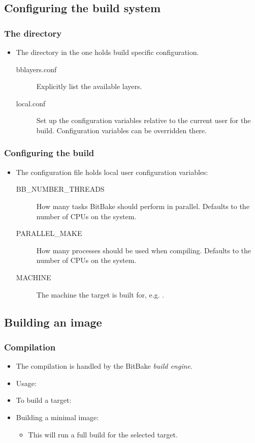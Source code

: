 \subsection{Configuring the build system}

\begin{frame}
  \frametitle{The  directory}
  \begin{itemize}
    \item The  directory in the  one holds 
      build specific configuration.
    \begin{description}
      \item[bblayers.conf] Explicitly list the available layers.
      \item[local.conf] Set up the configuration variables relative to
        the current user for the build. Configuration variables can be
        overridden there.
    \end{description}
  \end{itemize}
\end{frame}

\begin{frame}
  \frametitle{Configuring the build}
  \begin{itemize}
    \item The  configuration file holds local
    user configuration variables:
    \begin{description}
      \item[BB\_NUMBER\_THREADS] How many tasks BitBake should perform
        in parallel. Defaults to the number of CPUs on the system.
      \item[PARALLEL\_MAKE] How many processes should be used when
        compiling. Defaults to the number of CPUs on the system.
      \item[MACHINE] The machine the target is built for, e.g.
        .
    \end{description}
  \end{itemize}
\end{frame}

\subsection{Building an image}

\begin{frame}
  \frametitle{Compilation}
  \begin{itemize}
    \item The compilation is handled by the BitBake {\em build
      engine}.
    \item Usage: 
    \item To build a target: 
    \item Building a minimal image: 
    \begin{itemize}
      \item This will run a full build for the selected target.
    \end{itemize}
  \end{itemize}
\end{frame}
